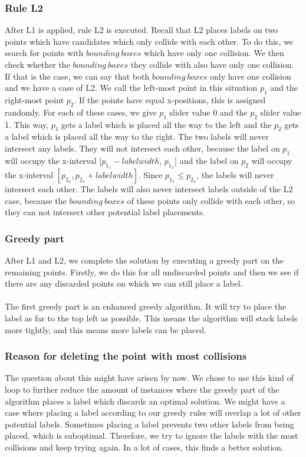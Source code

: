 \documentclass[crop=false,a4paper,oneside,11pt]{article}
\begin{document}
\subsubsection{Rule L2}
After L1 is applied, rule L2 is executed. Recall that L2 places labels on two points which have candidates which only collide with each other. To do this, we search for points with $bounding \ boxes$ which have only one collision. We then check whether the $bounding \ boxes$ they collide with also have only one collision. If that is the case, we can say that both $bounding \ boxes$ only have one collision and we have a case of L2. We call the left-most point in this situation $p_1$ and the right-most point $p_2$. If the points have equal x-positions, this is assigned randomly. For each of these cases, we give $p_1$ slider value 0 and the $p_2$ slider value 1. This way, $p_1$ gets a label which is placed all the way to the left and the $p_2$ gets a label which is placed all the way to the right. The two labels will never intersect any labels. They will not intersect each other, because the label on $p_1$ will occupy the x-interval $[p_{1_x} - labelwidth$, $p_{1_x}]$ and the label on $p_2$ will occupy the x-interval $[p_{2_x}, p_{2_x} + labelwidth]$. Since $p_{1_x} \leq p_{2_x}$, the labels will never intersect each other. The labels will also never intersect labels outside of the L2 case, because the $bounding \ boxes$ of these points only collide with each other, so they can not intersect other potential label placements.
\subsubsection{Greedy part}
After L1 and L2, we complete the solution by executing a greedy part on the remaining points. Firstly, we do this for all undiscarded points and then we see if there are any discarded points on which we can still place a label.\\
\\
The first greedy part is an enhanced greedy algorithm. It will try to place the label as far to the top left as possible. This means the algorithm will stack labels more tightly, and this means more labels can be placed.

\subsubsection{Reason for deleting the point with most collisions}
The question about this might have arisen by now. We chose to use this kind of loop to further reduce the amount of instances where the greedy part of the algorithm places a label which discards an optimal solution. We might have a case where placing a label according to our greedy rules will overlap a lot of other potential labels. Sometimes placing a label prevents two other labels from being placed, which is suboptimal. Therefore, we try to ignore the labels with the most collisions and keep trying again. In a lot of cases, this finds a better solution.
\end{document}
